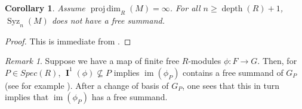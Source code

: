 \documentclass[a4,12pt]{amsart}
\numberwithin{equation}{section}
\newtheorem{cor}[equation]{Corollary}
\theoremstyle{definition}
\theoremstyle{remark}
\newtheorem{rem}[equation]{Remark}
\newcommand{\projdim}{\operatorname{proj\,dim}}
\numberwithin{equation}{section}
\def\depth{\operatorname{depth}}
\def\I{\operatorname{I}}
\def\im{\operatorname{im}}
\def\syz{\Omega}
\def\syz{\operatorname{Syz}}
\def\I{\operatorname{\mathbf{I}}}
\begin{document}
 \begin{cor}
     Assume $\projdim_R(M)=\infty$. For all $n\geq \depth(R)+1$, $\syz_n(M)$ does not have a free summand.
 \end{cor}
 \begin{proof}
     This is immediate from .
 \end{proof}

 \begin{rem}\label{rem: BH}
     Suppose we have a map of finite free $R$-modules $\phi:F\rightarrow G$. Then, for $P\in Spec(R)$, $\I^1(\phi)\not\subseteq P$ implies $\im(\phi_P)$ contains a free summand of $G_P$ (see for example \cite[Lemma 1.4.8]{bruns_herzog}). After a change of basis of $G_P$, one sees that this in turn implies that $\im(\phi_P)$ has a free summand.
 \end{rem}




\end{document}
